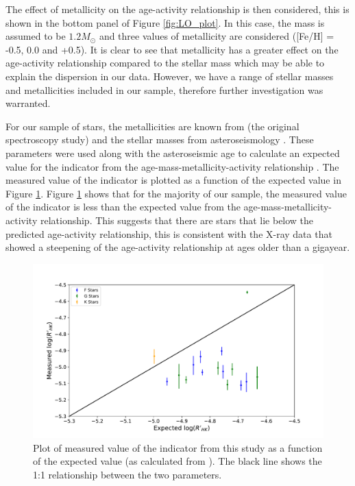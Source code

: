 The effect of metallicity on the age-activity relationship is then considered, this is shown in the bottom panel of Figure \ref{fig:LO_plot}. In this case, the mass is assumed to be $1.2 M_{\odot}$ and three values of metallicity are considered ([Fe/H] = -0.5, 0.0 and +0.5). It is clear to see that metallicity has a greater effect on the age-activity relationship compared to the stellar mass which may be able to explain the dispersion in our data. However, we have a range of stellar masses and metallicities included in our sample, therefore further investigation was warranted.

For our sample of stars, the metallicities are known from \citet{Bruntt_etal_2012} (the original spectroscopy study) and the stellar masses from asteroseismology \citep{Chaplin_etal_2014,Silva_Aguirre_etal_2017}. These parameters were used along with the asteroseismic age to calculate an expected value for the \Rprime indicator from the age-mass-metallicity-activity relationship \citep{Lorenzo_Oliveira_etal_2016}. The measured value of the \Rprime indicator is plotted as a function of the expected value in Figure \ref{fig:Rprime_measured_v_expected}. Figure \ref{fig:Rprime_measured_v_expected} shows that for the majority of our sample, the measured value of the \Rprime indicator is less than the expected value from the age-mass-metallicity-activity relationship. This suggests that there are stars that lie below the predicted age-activity relationship, this is consistent with the X-ray data \citep{Booth_etal_2017} that showed a steepening of the age-activity relationship at ages older than a gigayear.

\begin{figure}
    \centering
    \includegraphics[scale=0.55]{Figures/4-Chromospheric_age/rhk_measured_v_expected.pdf}
    \caption[Measured \Rprime as a function of the expected value including mass and metallicity]{Plot of measured value of the \Rprime indicator from this study as a function of the expected value (as calculated from \citealt{Lorenzo_Oliveira_etal_2016}). The black line shows the 1:1 relationship between the two parameters.}
    \label{fig:Rprime_measured_v_expected}
\end{figure}

